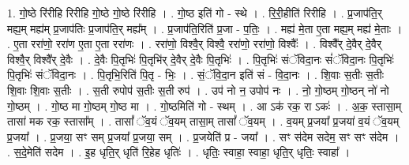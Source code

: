 \documentclass[17pt]{extarticle}
\begin{document}
1. गो॒ष्ठे रि॑रीहि रिरीहि गो॒ष्ठे गो॒ष्ठे रि॑रीहि । . गो॒ष्ठ इति॑ गो - स्थे । . रि॒री॒हीति॑ रिरीहि । . प्र॒जाप॑ति॒र् मह्य॒म् मह्य॑म् प्र॒जाप॑तिः प्र॒जाप॑ति॒र् मह्य᳚म् । . प्र॒जाप॑ति॒रिति॑ प्र॒जा - प॒तिः॒ । . मह्य॑ मे॒ता ए॒ता मह्य॒म् मह्य॑ मे॒ताः । . ए॒ता ररा॑णो॒ ररा॑ण ए॒ता ए॒ता ररा॑णः । . ररा॑णो॒ विश्वै॒र् विश्वै॒ ररा॑णो॒ ररा॑णो॒ विश्वैः᳚ । . विश्वै᳚र् दे॒वैर् दे॒वैर् विश्वै॒र् विश्वै᳚र् दे॒वैः । . दे॒वैः पि॒तृभिः॑ पि॒तृभि॑र् दे॒वैर् दे॒वैः पि॒तृभिः॑ । . पि॒तृभिः॑ संॅविदा॒नः सं॑ॅविदा॒नः पि॒तृभिः॑ पि॒तृभिः॑ संॅविदा॒नः । . पि॒तृभि॒रिति॑ पि॒तृ - भिः॒ । . सं॒ॅवि॒दा॒न इति॑ सं - वि॒दा॒नः । . शि॒वाः स॒तीः स॒तीः शि॒वाः शि॒वाः स॒तीः । . स॒ती रुपोप॑ स॒तीः स॒ती रुप॑ । . उप॑ नो न॒ उपोप॑ नः । . नो॒ गो॒ष्ठम् गो॒ष्ठन् नो॑ नो गो॒ष्ठम् । . गो॒ष्ठ मा गो॒ष्ठम् गो॒ष्ठ मा । . गो॒ष्ठमिति॑ गो - स्थम् । . आ ऽक॑ रक॒ रा ऽकः॑ । . अ॒क॒ स्तासा॒म् तासा॑ मक रक॒ स्तासा᳚म् । . तासां᳚ ॅव॒यं ॅव॒यम् तासा॒म् तासां᳚ ॅव॒यम् । . व॒यम् प्र॒जया᳚ प्र॒जया॑ व॒यं ॅव॒यम् प्र॒जया᳚ । . प्र॒जया॒ सꣳ सम् प्र॒जया᳚ प्र॒जया॒ सम् । . प्र॒जयेति॑ प्र - जया᳚ । . सꣳ स॑देम सदेम॒ सꣳ सꣳ स॑देम । . स॒दे॒मेति॑ सदेम । . इ॒ह धृति॒र् धृति॑ रि॒हेह धृतिः॑ । . धृतिः॒ स्वाहा॒ स्वाहा॒ धृति॒र् धृतिः॒ स्वाहा᳚ । \newline
\end{document}
